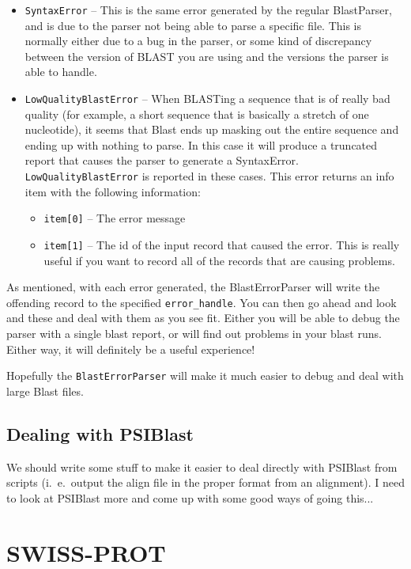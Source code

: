 \documentclass{report}
\begin{document}
\begin{itemize}
  \item \verb|SyntaxError| -- This is the same error generated by the regular BlastParser, and is due to the parser not being able to parse a specific file. This is normally either due to a bug in the parser, or some kind of discrepancy between the version of BLAST you are using and the versions the parser is able to handle.

  \item \verb|LowQualityBlastError| -- When BLASTing a sequence that is of really bad quality (for example, a short sequence that is basically a stretch of one nucleotide), it seems that Blast ends up masking out the entire sequence and ending up with nothing to parse. In this case it will produce a truncated report that causes the parser to generate a SyntaxError. \verb|LowQualityBlastError| is reported in these cases. This error returns an info item with the following information:
  \begin{itemize}
    \item \verb|item[0]| -- The error message
    \item \verb|item[1]| -- The id of the input record that caused the error. This is really useful if you want to record all of the records that are causing problems.
  \end{itemize}
\end{itemize}

As mentioned, with each error generated, the BlastErrorParser will write the offending record to the specified \verb|error_handle|. You can then go ahead and look and these and deal with them as you see fit. Either you will be able to debug the parser with a single blast report, or will find out problems in your blast runs. Either way, it will definitely be a useful experience!


Hopefully the \verb|BlastErrorParser| will make it much easier to debug and deal with large Blast files.

\subsection{Dealing with PSIBlast}

We should write some stuff to make it easier to deal directly with PSIBlast from scripts (i.~e.~output the align file in the proper format from an alignment). I need to look at PSIBlast more and come up with some good ways of going this...

\section{SWISS-PROT}
\label{sec:swiss_prot}
\end{document}
